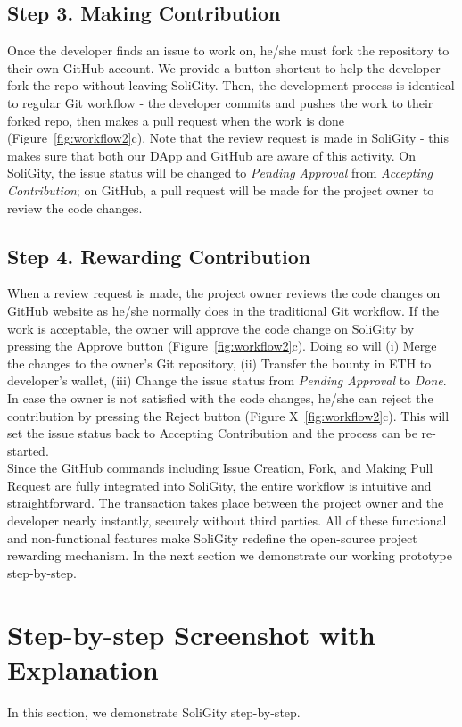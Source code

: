 \documentclass[12pt]{article}
\renewcommand{\_}{\kern-1.5pt\textunderscore\kern-1.5pt}
\begin{document}
\subsection*{Step 3. Making Contribution}

Once the developer finds an issue to work on, he/she must fork the repository to their own GitHub account. We provide a button shortcut to help the developer fork the repo without leaving SoliGity. Then, the development process is identical to regular Git workflow - the developer commits and pushes the work to their forked repo, then makes a pull request when the work is done (Figure~\ref{fig:workflow2}c). Note that the review request is made in SoliGity - this makes sure that both our DApp and GitHub are aware of this activity. On SoliGity, the issue status will be changed to \textit{Pending Approval} from \textit{Accepting Contribution}; on GitHub, a pull request will be made for the project owner to review the code changes.

\subsection*{Step 4. Rewarding Contribution}
When a review request is made, the project owner reviews the code changes on GitHub website as he/she normally does in the traditional Git workflow. If the work is acceptable, the owner will approve the code change on SoliGity by pressing the Approve button (Figure~\ref{fig:workflow2}c). Doing so will (i) Merge the changes to the owner’s Git repository,
(ii) Transfer the bounty in ETH to developer’s wallet,
(iii) Change the issue status from \textit{Pending Approval} to \textit{Done}. In case the owner is not satisfied with the code changes, he/she can reject the contribution by pressing the Reject button (Figure X~\ref{fig:workflow2}c). This will set the issue status back to Accepting Contribution and the process can be re-started.  \\


\noindent Since the GitHub commands including Issue Creation, Fork, and Making Pull Request are fully integrated into SoliGity, the entire workflow is intuitive and straightforward. The transaction takes place between the project owner and the developer nearly instantly, securely without third parties. All of these functional and non-functional features make SoliGity redefine the open-source project rewarding mechanism. In the next section we demonstrate our working prototype step-by-step.

\section{Step-by-step Screenshot with Explanation}
In this section, we demonstrate SoliGity step-by-step.
\end{document}
